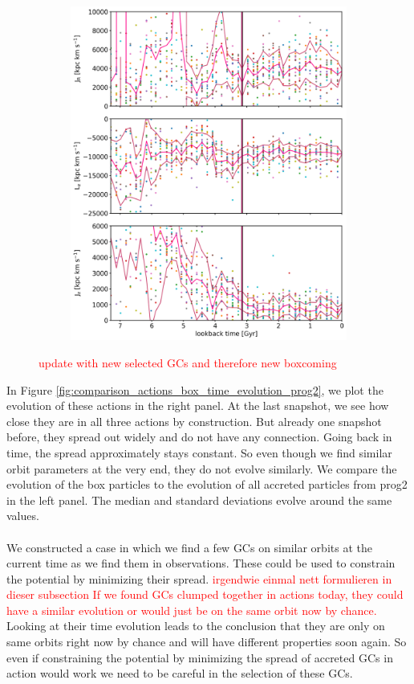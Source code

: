 \begin{figure}[htbp]
\begin{subfigure}[c]{0.48\textwidth}
	    \includegraphics[width=\textwidth]{plots/Dynamics/prog2/action_time_evolution_box_hist_mean_prog2.png}
    \end{subfigure}
    \caption{\textcolor{red}{update with new selected GCs and therefore new boxcoming}}\label{fig:comparison_actions_time_evolution_box_prog2}
\end{figure}
In Figure \ref{fig:comparison_actions_box_time_evolution_prog2}, we plot the evolution of these actions in the right panel. At the last snapshot, we see how close they are in all three actions by construction. But already one snapshot before, they spread out widely and do not have any connection. Going back in time, the spread approximately stays constant. So even though we find similar orbit parameters at the very end, they do not evolve similarly. We compare the evolution of the box particles to the evolution of all accreted particles from prog2 in the left panel. The median and standard deviations evolve around the same values. \\\\
We constructed a case in which we find a few \acp{GC} on similar orbits at the current time as we find them in observations. These could be used to constrain the potential by minimizing their spread. \textcolor{red}{ irgendwie einmal nett formulieren in dieser subsection If we found \acp{GC} clumped together in actions today, they could have a similar evolution or would just be on the same orbit now by chance. }Looking at their time evolution leads to the conclusion that they are only on same orbits right now by chance and will have different properties soon again. So even if constraining the potential by minimizing the spread of accreted \acp{GC} in action would work we need to be careful in the selection of these \acp{GC}.
